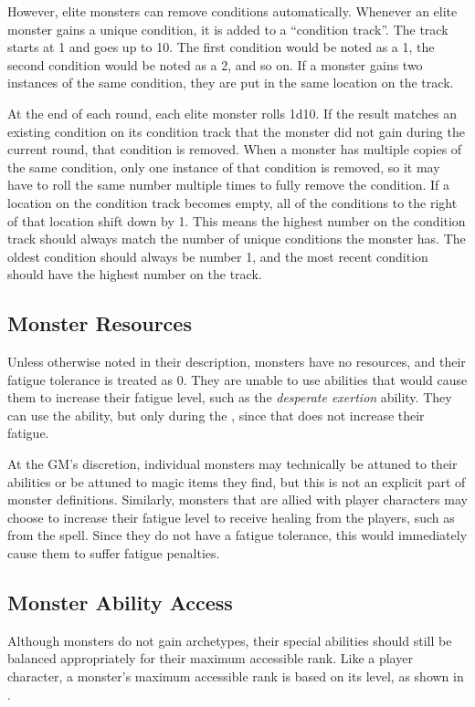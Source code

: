             However, elite monsters can remove conditions automatically.
            Whenever an elite monster gains a unique condition, it is added to a ``condition track''.
            The track starts at 1 and goes up to 10.
            The first condition would be noted as a 1, the second condition would be noted as a 2, and so on.
            If a monster gains two instances of the same condition, they are put in the same location on the track.

            At the end of each round, each elite monster rolls 1d10.
            If the result matches an existing condition on its condition track that the monster did not gain during the current round, that condition is removed.
            When a monster has multiple copies of the same condition, only one instance of that condition is removed, so it may have to roll the same number multiple times to fully remove the condition.
            If a location on the condition track becomes empty, all of the conditions to the right of that location shift down by 1.
            This means the highest number on the condition track should always match the number of unique conditions the monster has.
            The oldest condition should always be number 1, and the most recent condition should have the highest number on the track.

        \subsection{Monster Resources}
            Unless otherwise noted in their description, monsters have no resources, and their fatigue tolerance is treated as 0.
            They are unable to use abilities that would cause them to increase their fatigue level, such as the \textit{desperate exertion} ability.
            They can use the  ability, but only during the , since that does not increase their fatigue.

            At the GM's discretion, individual monsters may technically be attuned to their abilities or be attuned to magic items they find, but this is not an explicit part of monster definitions.
            Similarly, monsters that are allied with player characters may choose to increase their fatigue level to receive healing from the players, such as from the  spell.
            Since they do not have a fatigue tolerance, this would immediately cause them to suffer fatigue penalties.

        \subsection{Monster Ability Access}\label{Monster Ability Access}
            Although monsters do not gain archetypes, their special abilities should still be balanced appropriately for their maximum accessible rank.
            Like a player character, a monster's maximum accessible rank is based on its level, as shown in .

